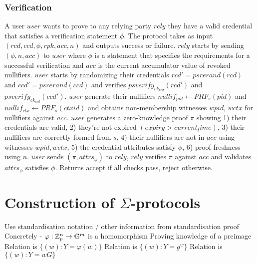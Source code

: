 {\subsubsection{Verification}
A user $user$ wants to prove to any relying party $rely$ they have a valid credential that satisfies a verification statement $\phi$.
The protocol takes as input $(rcd, ccd, \phi, rpk, acc, n)$ and outputs success or failure.
$rely$ starts by sending $(\phi, n, acc)$ to $user$ where $\phi$ is a statement that specifies the requirements for a successful verification and $acc$ is the current accumulator value of revoked nullifiers.
$user$ starts by randomizing their credentials $rcd' = psrerand(rcd)$ and $ccd' = psrerand(ccd)$ and verifies $psverify_{ck_{rcd}}(rcd')$ and $psverify_{ck_{ccd}}(ccd')$. $user$ generate their nullifiers $nullif_{pid} \gets PRF_s(pid)$ and $nullif_{ctx} \gets PRF_s(ctxid)$ and obtains non-membership witnesses $wpid$, $wctx$ for nullifiers against $acc$.
$user$ generates a zero-knowledge proof $\pi$ showing 1) their credentials are valid, 2) they're not expired $(expiry > current_time)$, 3) their nullifiers are correctly formed from $s$, 4) their nullifiers are not in $acc$ using witnesses $wpid, wctx$, 5) the credential attributes satisfy $\phi$, 6) proof freshness using $n$.
$user$ sends $(\pi, attrs_{\phi})$ to $rely$, $rely$ verifies $\pi$ against $acc$ and validates $attrs_{\phi}$ satisfies $\phi$. Returns accept if all checks pass, reject otherwise.



% 
% 





\newpage




% 
% 
% 

\section{Construction of $\Sigma$-protocols}\label{sec:sigmaproofs}

Use standardisation notation / other information from standardisation proof
Concretely
- $\varphi : \mathbb{Z}_p^n \to \mathbb{G}^m$ is a homomorphism 
Proving knowledge of a preimage
Relation is $\{(w) : Y = \varphi(w)\}$
Relation is $\{(w) : Y = g^w\}$
Relation is $\{(w) : Y = wG\}$



}
